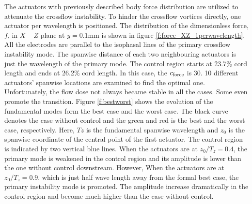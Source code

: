 \documentclass{AIAA}
\begin{document}
The actuators with previously described body force distribution are utilized to attenuate the crossflow instability. To hinder the crossflow vortices directly, one actuator per wavelength is positioned. The distribution of the dimensionless force, $f$, in $X-Z$ plane at $y=0.1$mm is shown in figure \ref{f:force_XZ_1perwavelength}. All the electrodes are parallel to the isophasal lines of the primary crossflow instability mode. The spanwise distance of each two neighbouring actuators is just the wavelength of the primary mode. The control region starts at 23.7\% cord length and ends at 26.2\% cord length. In this case, the $c_{\rm force}$ is 30. 10 different actuators' spanwise locations are examined to find the optimal one. Unfortunately, the flow dose not always became stable in all the cases. Some even promote the transition. Figure \ref{f:bestworst} shows the evolution of the fundamental modes form the best case and the worst case. The black curve denotes the case without control and the green and red is the best and the worst case, respectively. Here, $Tz$ is the fundamental spanwise wavelength and $z_0$ is the spanwise coordinate of the central point of the first actuator. The control region is indicated by two vertical blue lines. When the actuators are at $z_0/T_z=0.4$, the primary mode is weakened in the control region and its amplitude is lower than the one without control downstream. However, When the actuators are at $z_0/T_z=0.9$, which is just half wave length away from the formal best case, the primary instability mode is promoted. The amplitude increase dramatically in the control region and become much higher than the case without control.
\end{document}
